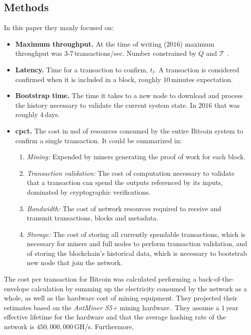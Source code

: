 \subsection{Methods}
In this paper they manly focused on:
\begin{itemize}[noitemsep]
	\item \textbf{Maximum throughput.} At the time of writing ($2016$) maximum
	throughput was $3$-$7$\,transactions/sec. Number constrained by
	$Q$ and $\mathcal{T}$ .
	\item \textbf{Latency.} Time for a transaction to confirm, $t_l$. A transaction
	is considered confirmed when it is included in a block, roughly $10$\,minutes
	expectation.
	\item \textbf{Bootstrap time.} The time it takes to a new node to download and
	process the history necessary to validate the current system
	state. In $2016$ that was roughly $4$\,days. 
	\item \textbf{\gls{cpct}.} The cost in \gls{usd} of resources consumed
	by the entire Bitcoin system to confirm a single transaction. It could be
	summarized in:
	\begin{enumerate}
		\item \emph{Mining:} Expended by miners generating the proof of work
		for each block.
		\item \emph{Transaction validation:} The cost of computation necessary
		to validate that a transaction can spend the outputs referenced by its inputs,
		dominated by cryptographic verifications.
		\item \emph{Bandwidth:} The cost of network resources required to receive
		and transmit transactions, blocks and metadata.
		\item \emph{Storage:} The cost of storing all currently spendable
		transactions, which is necessary for miners and full nodes to perform
		transaction validation, and of storing the blockchain's historical data,
		which is necessary to bootstrab new node that join the network.
	\end{enumerate}
\end{itemize}
The cost per transaction for Bitcoin was calculated performing a
back-of-the-envelope calculation by summing up the electricity
consumed by the network as a whole, as well as the hardware cost
of mining equipment. They projected their estimates based on the
\emph{AntMiner S5+} mining hardware\,\cite{mining_hw}. They assume
a $1$\,year effective lifetime for the hardware and that the average
hashing rate of the network is $450,000,000$\,GH/s. Furthermore,
